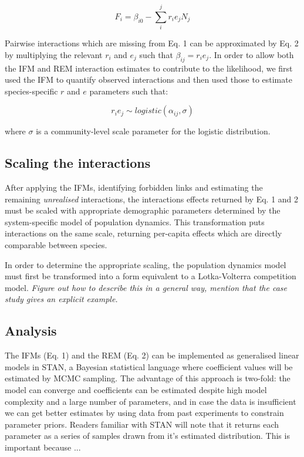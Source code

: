 \documentclass[a4,12pt]{article}
\begin{document}
        \begin{equation}
        F_{i} = \beta_{i0} - \sum_{i}^{j} r_{i} e_{j} N_{j}
        \label{rem1}
        \end{equation}
        
        Pairwise interactions which are missing from Eq. 1 can be approximated by Eq. 2 by multiplying the relevant $r_{i}$ and $e_{j}$ such that $\beta_{ij} = r_{i} e_{j}$. In order to allow both the IFM and REM interaction estimates to contribute to the likelihood, we first used the IFM to quantify observed interactions and then used those to estimate species-specific $r$ and $e$ parameters such that: 
    
        \begin{equation}
        r_i e_j \sim logistic \left ( \alpha_{ij}, \sigma \right )
        \label{unrealised}
        \end{equation}
    
    where $\sigma$ is a community-level scale parameter for the logistic distribution. 
        
        \subsection{Scaling the interactions}
        
        After applying the IFMs, identifying forbidden links and estimating the remaining \textit{unrealised} interactions, the interactions effects returned by Eq. 1 and 2 must be scaled with appropriate demographic parameters determined by the system-specific model of population dynamics. This transformation puts interactions on the same scale, returning per-capita effects which are directly comparable between species. 
        
        In order to determine the appropriate scaling, the population dynamics model must first be transformed into a form equivalent to a Lotka-Volterra competition model. \textit{Figure out how to describe this in a general way, mention that the case study gives an explicit example.}
        
        \subsection{Analysis}
        
        The IFMs (Eq. 1) and the REM (Eq. 2) can be implemented as generalised linear models in STAN, a Bayesian statistical language where coefficient values will be estimated by MCMC sampling. The advantage of this approach is two-fold: the model can converge and coefficients can be estimated despite high model complexity and a large number of parameters, and in case the data is insufficient we can get better estimates by using data from past experiments to constrain parameter priors. Readers familiar with STAN will note that it returns each parameter as a series of samples drawn from it's estimated distribution. This is important because ...
    
\end{document}
